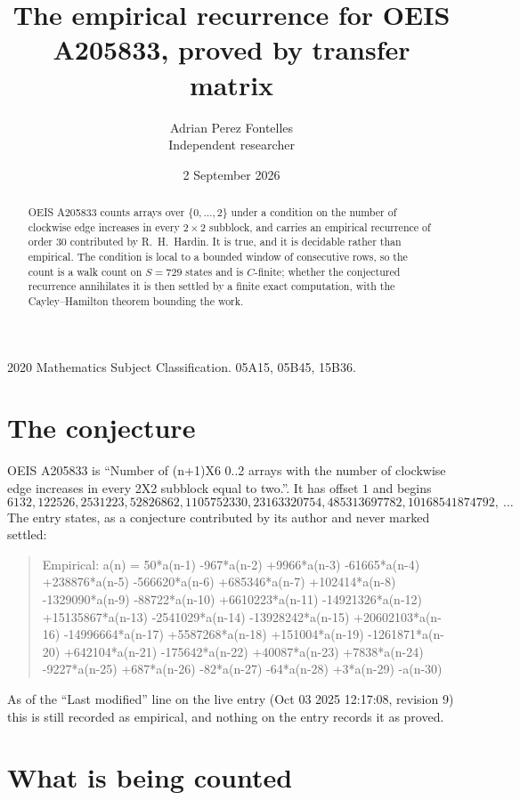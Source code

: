 \documentclass[11pt,a4paper]{article}
\title{The empirical recurrence for OEIS A205833, proved by transfer matrix}
\author{Adrian Perez Fontelles\\ \small Independent researcher}
\date{2 September 2026}
\theoremstyle{plain}
\theoremstyle{definition}
\begin{document}
\maketitle

\begin{abstract}
OEIS A205833 counts arrays over $\{0,\dots,2\}$ under a condition on the number of clockwise edge increases
in every $2\times2$ subblock, and carries an empirical recurrence of order $30$ contributed by
R.~H.~Hardin. It is true, and it is decidable rather than empirical. The condition is local to
a bounded window of consecutive rows, so the count is a walk count on $S=729$ states and is
$C$-finite; whether the conjectured recurrence annihilates it is then settled by a finite exact
computation, with the Cayley--Hamilton theorem bounding the work.
\end{abstract}

\noindent\small 2020 Mathematics Subject Classification. 05A15, 05B45, 15B36.\normalsize

\section{The conjecture}

OEIS A205833 is ``Number of (n+1)X6 0..2 arrays with the number of clockwise edge increases in every 2X2 subblock equal to two.''. It has offset $1$ and begins
\[
6132, 122526, 2531223, 52826862, 1105752330, 23163320754, 485313697782, 10168541874792,\ \dots
\]
The entry states, as a conjecture contributed by its author and never marked settled:
\begin{quote}
Empirical: a(n) = 50*a(n-1) -967*a(n-2) +9966*a(n-3) -61665*a(n-4) +238876*a(n-5) -566620*a(n-6) +685346*a(n-7) +102414*a(n-8) -1329090*a(n-9) -88722*a(n-10) +6610223*a(n-11) -14921326*a(n-12) +15135867*a(n-13) -2541029*a(n-14) -13928242*a(n-15) +20602103*a(n-16) -14996664*a(n-17) +5587268*a(n-18) +151004*a(n-19) -1261871*a(n-20) +642104*a(n-21) -175642*a(n-22) +40087*a(n-23) +7838*a(n-24) -9227*a(n-25) +687*a(n-26) -82*a(n-27) -64*a(n-28) +3*a(n-29) -a(n-30)
\end{quote}
As of the ``Last modified'' line on the live entry (Oct 03 2025 12:17:08, revision 9) this is still
recorded as empirical, and nothing on the entry records it as proved.

\section{What is being counted}
\end{document}
